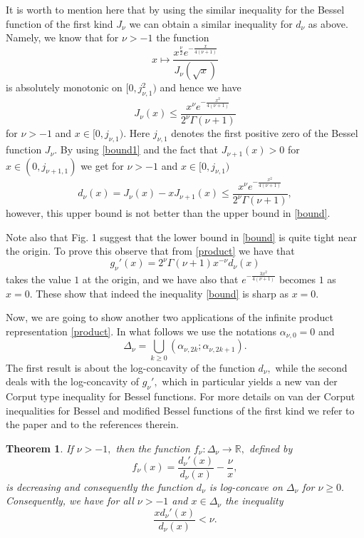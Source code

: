 \documentclass[journal]{IEEEtran}
\newtheorem{theorem}{Theorem}
\begin{document}
It is worth to mention here that by using the similar inequality for the Bessel function of the
first kind $J_{\nu}$ we can obtain a similar inequality for $d_{\nu}$ as above. Namely, we know that \cite[Corollary 7]{isma} for $\nu>-1$ the function $$x\mapsto \frac{x^{\frac{\nu}{2}}e^{-\frac{x}{4(\nu+1)}}}{J_{\nu}(\sqrt{x})}$$
is absolutely monotonic on $[0,j_{\nu,1}^2)$ and hence we have
\begin{equation}\label{bound1}
J_{\nu}(x)\leq \frac{x^{\nu}e^{-\frac{x^2}{4(\nu+1)}}}{2^{\nu}\Gamma(\nu+1)}
\end{equation}
for $\nu>-1$ and $x\in[0,j_{\nu,1}).$ Here $j_{\nu,1}$ denotes the first positive zero of the Bessel function $J_{\nu}.$ By using \eqref{bound1} and the fact that $J_{\nu+1}(x)>0$ for $x\in(0,j_{\nu+1,1})$ we get for $\nu>-1$ and $x\in[0,j_{\nu,1})$
$$d_{\nu}(x)=J_{\nu}(x)-xJ_{\nu+1}(x)\leq \frac{x^{\nu}e^{-\frac{x^2}{4(\nu+1)}}}{2^{\nu}\Gamma(\nu+1)},$$
however, this upper bound is not better than the upper bound in \eqref{bound}.

Note also that Fig. 1 suggest that the lower bound in \eqref{bound} is quite tight near the origin. To prove this observe that from \eqref{product}
we have that $$g_{\nu}'(x)=2^{\nu}\Gamma(\nu+1)x^{-\nu}d_{\nu}(x)$$ takes the value $1$ at the origin, and we have also that $e^{-\frac{3x^2}{4(\nu+1)}}$ becomes $1$ as $x=0.$ These show that indeed the inequality \eqref{bound} is sharp as $x=0.$

Now, we are going to show another two applications of the infinite product representation \eqref{product}. In what follows we use the notations $\alpha_{\nu,0}=0$ and $$\Delta_{\nu}=\bigcup_{k\geq0}(\alpha_{\nu,2k};\alpha_{\nu,2k+1}).$$
The first result is about the log-concavity of the function $d_{\nu},$ while the second deals with the log-concavity of $g_{\nu}',$ which in particular yields a new van der Corput type inequality for Bessel functions. For more details on van der Corput inequalities for Bessel and modified Bessel functions of the first kind we refer to the paper \cite{blp} and to the references therein.

\begin{theorem}
{\em If $\nu>-1,$ then the function $f_{\nu}:\Delta_{\nu}\to\mathbb{R},$ defined by $$f_{\nu}(x)=\frac{d_{\nu}'(x)}{d_{\nu}(x)}-\frac{\nu}{x},$$
is decreasing and consequently the function $d_{\nu}$ is log-concave on $\Delta_{\nu}$ for $\nu\geq0.$ Consequently, we have
for all $\nu>-1$ and $x\in\Delta_{\nu}$ the inequality
\begin{equation}\label{logar}\frac{xd_{\nu}'(x)}{d_{\nu}(x)}<\nu.\end{equation}}
\end{theorem}
\end{document}
